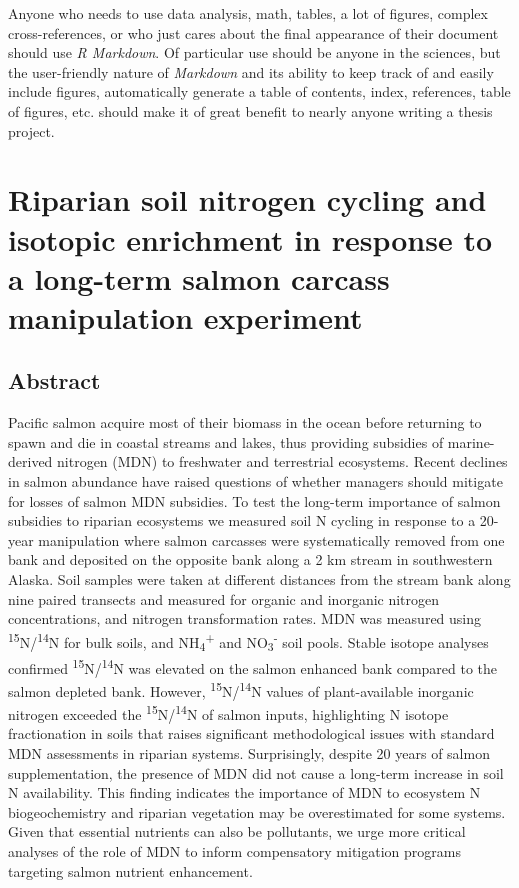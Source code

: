 \documentclass [11pt, proquest] {uwthesis}[2015/03/03]
\begin{document}
Anyone who needs to use data analysis, math, tables, a lot of figures,
complex cross-references, or who just cares about the final appearance
of their document should use \emph{R Markdown}. Of particular use should
be anyone in the sciences, but the user-friendly nature of
\emph{Markdown} and its ability to keep track of and easily include
figures, automatically generate a table of contents, index, references,
table of figures, etc. should make it of great benefit to nearly anyone
writing a thesis project.

\chapter{Riparian soil nitrogen cycling and isotopic enrichment in
response to a long-term salmon carcass manipulation
experiment}\label{riparian-soil-nitrogen-cycling-and-isotopic-enrichment-in-response-to-a-long-term-salmon-carcass-manipulation-experiment}

\section{Abstract}\label{abstract}

Pacific salmon acquire most of their biomass in the ocean before
returning to spawn and die in coastal streams and lakes, thus providing
subsidies of marine-derived nitrogen (MDN) to freshwater and terrestrial
ecosystems. Recent declines in salmon abundance have raised questions of
whether managers should mitigate for losses of salmon MDN subsidies. To
test the long-term importance of salmon subsidies to riparian ecosystems
we measured soil N cycling in response to a 20-year manipulation where
salmon carcasses were systematically removed from one bank and deposited
on the opposite bank along a 2 km stream in southwestern Alaska. Soil
samples were taken at different distances from the stream bank along
nine paired transects and measured for organic and inorganic nitrogen
concentrations, and nitrogen transformation rates. MDN was measured
using \textsuperscript{15}N/\textsuperscript{14}N for bulk soils, and
NH\textsubscript{4}\textsuperscript{+} and
NO\textsubscript{3}\textsuperscript{-} soil pools. Stable isotope
analyses confirmed \textsuperscript{15}N/\textsuperscript{14}N was
elevated on the salmon enhanced bank compared to the salmon depleted
bank. However, \textsuperscript{15}N/\textsuperscript{14}N values of
plant-available inorganic nitrogen exceeded the
\textsuperscript{15}N/\textsuperscript{14}N of salmon inputs,
highlighting N isotope fractionation in soils that raises significant
methodological issues with standard MDN assessments in riparian systems.
Surprisingly, despite 20 years of salmon supplementation, the presence
of MDN did not cause a long-term increase in soil N availability. This
finding indicates the importance of MDN to ecosystem N biogeochemistry
and riparian vegetation may be overestimated for some systems. Given
that essential nutrients can also be pollutants, we urge more critical
analyses of the role of MDN to inform compensatory mitigation programs
targeting salmon nutrient enhancement.
\end{document}
